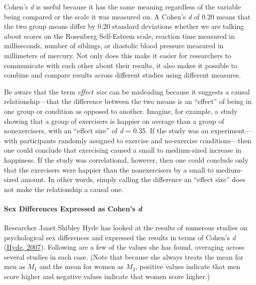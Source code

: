 \documentclass[
]{krantz}
\begin{document}
Cohen's \emph{d} is useful because it has the same meaning regardless of the variable being compared or the scale it was measured on. A Cohen's \emph{d} of 0.20 means that the two group means differ by 0.20 standard deviations whether we are talking about scores on the Rosenberg Self-Esteem scale, reaction time measured in milliseconds, number of siblings, or diastolic blood pressure measured in millimeters of mercury. Not only does this make it easier for researchers to communicate with each other about their results, it also makes it possible to combine and compare results across different studies using different measures.

Be aware that the term \emph{effect size} can be misleading because it suggests a causal relationship---that the difference between the two means is an ``effect'' of being in one group or condition as opposed to another. Imagine, for example, a study showing that a group of exercisers is happier on average than a group of nonexercisers, with an ``effect size'' of \emph{d} = 0.35. If the study was an experiment---with participants randomly assigned to exercise and no-exercise conditions---then one could conclude that exercising caused a small to medium-sized increase in happiness. If the study was correlational, however, then one could conclude only that the exercisers were happier than the nonexercisers by a small to medium-sized amount. In other words, simply calling the difference an ``effect size'' does not make the relationship a causal one.

\hypertarget{sex-differences-expressed-as-cohens-d}{%
\paragraph*{\texorpdfstring{Sex Differences Expressed as Cohen's \emph{d}}{Sex Differences Expressed as Cohen's d}}\label{sex-differences-expressed-as-cohens-d}}

Researcher Janet Shibley Hyde has looked at the results of numerous studies on psychological sex differences and expressed the results in terms of Cohen's \emph{d} (\protect\hyperlink{ref-hyde2007new}{Hyde, 2007}). Following are a few of the values she has found, averaging across several studies in each case. (Note that because she always treats the mean for men as \(M_1\) and the mean for women as \(M_2\), positive values indicate that men score higher and negative values indicate that women score higher.)
\end{document}
